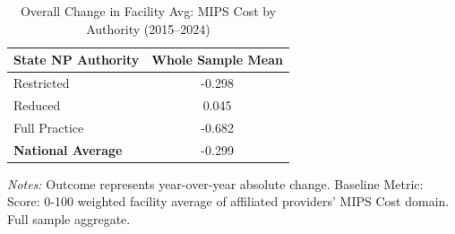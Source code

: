 \begin{table}[htbp]
    \centering
    \caption{Overall Change in Facility Avg: MIPS Cost by Authority (2015--2024)}
    \label{tab:d_fac_mips_cost_score_full}
    \vspace{0.2cm}
    \begin{tabular}{lc}
        \toprule
        \textbf{State NP Authority} & \textbf{Whole Sample Mean} \\
        \midrule
        Restricted & -0.298 \\
        Reduced & 0.045 \\
        Full Practice & -0.682 \\
        \midrule
        \textbf{National Average} & -0.299 \\
        \bottomrule
    \end{tabular}
    \vspace{0.1cm}
    \begin{minipage}{0.6\textwidth}
        \footnotesize \textit{Notes:} Outcome represents year-over-year absolute change. Baseline Metric: Score: 0-100 weighted facility average of affiliated providers' MIPS Cost domain. Full sample aggregate.
    \end{minipage}
\end{table}